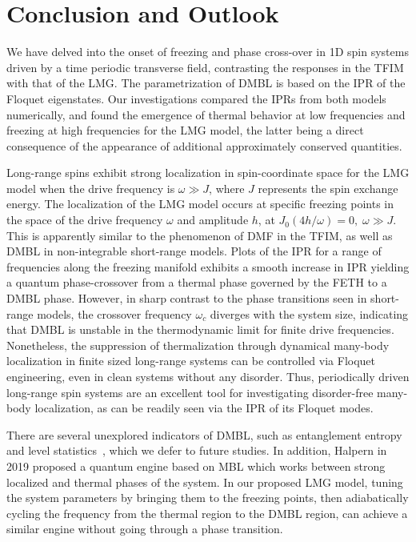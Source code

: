 \documentclass[%
reprint,
superscriptaddress,
amsmath,amssymb,
aps,
prb,
showkeys,
]{revtex4-2}
\begin{document}
\section{\label{sec:level7}Conclusion and Outlook}
We have delved into the onset of freezing and phase cross-over in 1D spin systems driven by a time periodic transverse field, contrasting the responses in the TFIM with that of the LMG. The parametrization of DMBL is based on the IPR of the Floquet eigenstates. Our investigations compared the IPRs from both models numerically, and found the emergence of thermal behavior at low frequencies and freezing at high frequencies for the LMG model, the latter being a direct consequence of the appearance of additional approximately conserved quantities.

Long-range spins exhibit strong localization in spin-coordinate space for the LMG model when the drive frequency is $\omega \gg J$, where $J$ represents the spin exchange energy. The localization of the LMG model occurs at specific freezing points in the space of the drive frequency $\omega$ and amplitude $h$, at $J_0(4h/\omega)=0,\; \omega \gg J$. This is apparently similar to the phenomenon of DMF in the TFIM, as well as DMBL in non-integrable short-range models. Plots of the IPR for a range of frequencies along the freezing manifold exhibits a smooth increase in IPR yielding a quantum phase-crossover from a thermal phase governed by the FETH to a DMBL phase. However, in sharp contrast to the phase transitions seen in short-range models, the crossover frequency $\omega_c$ diverges with the system size, indicating that DMBL is unstable in the thermodynamic limit for finite drive frequencies. Nonetheless, the suppression  of thermalization through  dynamical many-body localization in finite sized long-range systems can be controlled via Floquet engineering, even in clean systems without any disorder.	Thus, periodically driven long-range spin systems are an excellent tool for investigating disorder-free many-body localization, as can be readily seen via the IPR of its Floquet modes.


There are several unexplored indicators of DMBL, such as entanglement entropy and level statistics~\cite{khemani_phase_2016}, which we defer to future studies. In addition, Halpern in 2019 proposed a quantum engine based on MBL\cite{yunger_halpern_quantum_2019} which works  between strong localized and thermal phases of the system. In our proposed LMG model, tuning the system parameters by bringing them to the freezing points, then adiabatically cycling the frequency from the thermal region to the DMBL region, can achieve a similar engine without going through a phase transition. 
\end{document}

